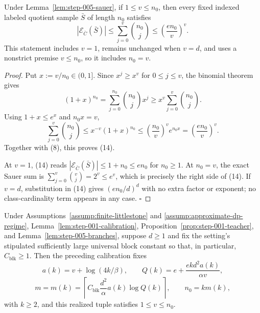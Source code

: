 \begin{lemma}\label{lem:step-005-binomial}
Under Lemma~\ref{lem:step-005-sauer}, if \(1\le v\le n_0\), then every fixed
indexed labeled quotient sample \(\bar S\) of length \(n_0\) satisfies
\[
|\mathcal E_{\bar C}(\bar S)|
\le \sum_{j=0}^{v}\binom{n_0}{j}
\le \left(\frac{e n_0}{v}\right)^v.
\tag{14}
\]
This statement includes \(v=1\), remains unchanged when \(v=d\), and uses a
nonstrict premise \(v\le n_0\), so it includes \(n_0=v\).


\end{lemma}

\begin{proof}
Put \(x:=v/n_0\in(0,1]\).  Since \(x^j\ge x^v\) for
\(0\le j\le v\), the binomial theorem gives
\[
(1+x)^{n_0}
=\sum_{j=0}^{n_0}\binom{n_0}{j}x^j
\ge x^v\sum_{j=0}^{v}\binom{n_0}{j}.
\tag{15}
\]
Using \(1+x\le e^x\) and \(n_0x=v\),
\[
\sum_{j=0}^{v}\binom{n_0}{j}
\le x^{-v}(1+x)^{n_0}
\le \left(\frac{n_0}{v}\right)^v e^{n_0x}
=\left(\frac{e n_0}{v}\right)^v.
\tag{16}
\]
Together with (8), this proves (14).

At \(v=1\), (14) reads
\(|\mathcal E_{\bar C}(\bar S)|\le1+n_0\le e n_0\) for \(n_0\ge1\).
At \(n_0=v\), the exact Sauer sum is
\(\sum_{j=0}^v\binom{v}{j}=2^v\le e^v\), which is precisely the right side
of (14).  If \(v=d\), substitution in (14) gives
\((e n_0/d)^d\) with no extra factor or exponent; no class-cardinality term
appears in any case. \(\square\)


\end{proof}

\begin{proposition}\label{prop:step-005-positive-range}
Under Assumptions~\ref{assump:finite-littlestone} and
\ref{assump:approximate-dp-regime}, Lemma~\ref{lem:step-001-calibration}, Proposition~\ref{prop:step-001-teacher}, and
Lemma~\ref{lem:step-005-branches}, suppose \(d\ge1\) and fix the setting's
stipulated sufficiently large universal block constant so that, in
particular, \(C_{\mathrm{blk}}\ge1\).  Then the preceding calibration fixes
\[
a(k)=v+\log(4k/\beta),\qquad
Q(k)=e+\frac{e k d^2a(k)}{\alpha v},
\]
\[
m=m(k)=\left\lceil C_{\mathrm{blk}}
\frac{d^2}{\alpha}a(k)\log Q(k)\right\rceil,
\qquad n_0=km(k),
\]
with \(k\ge2\), and this realized tuple satisfies \(1\le v\le n_0\).


\end{proposition}

